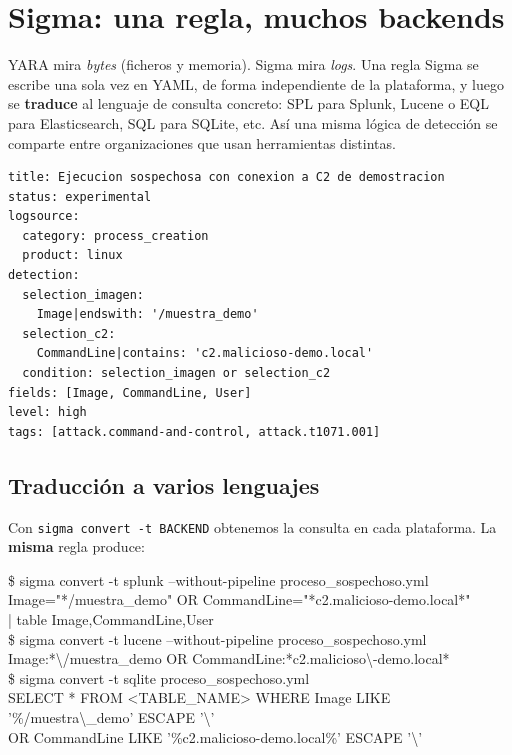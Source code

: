 \documentclass[11pt,a4paper]{article}
\begin{document}
\section{Sigma: una regla, muchos backends}

YARA mira \emph{bytes} (ficheros y memoria). Sigma mira \emph{logs}. Una regla
Sigma se escribe una sola vez en YAML, de forma independiente de la plataforma, y
luego se \textbf{traduce} al lenguaje de consulta concreto: SPL para Splunk,
Lucene o EQL para Elasticsearch, SQL para SQLite, etc. Así una misma lógica de
detección se comparte entre organizaciones que usan herramientas distintas.

\begin{lstlisting}[style=yaml,caption={\texttt{sigma/reglas/proceso\_sospechoso.yml}},captionpos=b]
title: Ejecucion sospechosa con conexion a C2 de demostracion
status: experimental
logsource:
  category: process_creation
  product: linux
detection:
  selection_imagen:
    Image|endswith: '/muestra_demo'
  selection_c2:
    CommandLine|contains: 'c2.malicioso-demo.local'
  condition: selection_imagen or selection_c2
fields: [Image, CommandLine, User]
level: high
tags: [attack.command-and-control, attack.t1071.001]
\end{lstlisting}

\subsection*{Traducción a varios lenguajes}

Con \texttt{sigma convert -t BACKEND} obtenemos la consulta en cada plataforma.
La \textbf{misma} regla produce:

\begin{terminal}
\$ sigma convert -t splunk --without-pipeline proceso\_sospechoso.yml\\
Image="*/muestra\_demo" OR CommandLine="*c2.malicioso-demo.local*"\\
\hspace*{2em}| table Image,CommandLine,User\\[6pt]
\$ sigma convert -t lucene --without-pipeline proceso\_sospechoso.yml\\
Image:*\textbackslash/muestra\_demo OR CommandLine:*c2.malicioso\textbackslash-demo.local*\\[6pt]
\$ sigma convert -t sqlite proceso\_sospechoso.yml\\
SELECT * FROM <TABLE\_NAME> WHERE Image LIKE '\%/muestra\textbackslash\_demo' ESCAPE '\textbackslash'\\
\hspace*{2em}OR CommandLine LIKE '\%c2.malicioso-demo.local\%' ESCAPE '\textbackslash'
\end{terminal}
\end{document}
